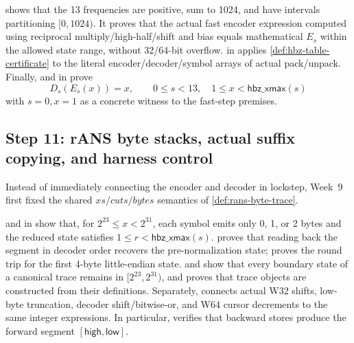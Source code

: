 \begin{verified}
\label{thm:hbz-rans-step}
\leavevmode\par
{} shows that the 13 frequencies are
positive, sum to 1024, and have intervals partitioning \([0,1024)\). It proves
that the actual fast encoder expression computed using reciprocal
multiply/high-half/shift and bias equals mathematical \(E_s\) within the allowed
state range, without 32/64-bit overflow.
 in
 applies
\cref{def:hbz-table-certificate} to the literal encoder/decoder/symbol arrays of
actual pack/unpack. Finally,  and
 in  prove
\[
  D_s(E_s(x))=x,\qquad
  0\le s<13,\quad 1\le x<\mathsf{hbz\_xmax}(s)
\]
with \(s=0,x=1\) as a concrete witness to the fast-step premises.
\end{verified}

\subsection{Step 11: rANS byte stacks, actual suffix copying, and harness control}

Instead of immediately connecting the encoder and decoder in lockstep, Week~9
first fixed the shared \(xs/cuts/bytes\) semantics of \cref{def:rans-byte-trace}.

\begin{verified}
\label{thm:rans-byte-stack}
 and  in
 show that, for \(2^{23}\le x<2^{31}\), each
symbol emits only 0, 1, or 2 bytes and the reduced state satisfies
\(1\le r<\mathsf{hbz\_xmax}(s)\).
 proves that reading back the segment in
decoder order recovers the pre-normalization state;
 proves the round trip for the first
4-byte little-endian state.
 and
 show that every boundary state of a
canonical trace remains in \([2^{23},2^{31})\), and
 proves that trace objects are
constructed from their definitions. Separately,
 connects actual W32 shifts, low-byte
truncation, decoder shift/bitwise-or, and W64 cursor decrements to the same
integer expressions. In particular,
 verifies that backward stores
produce the forward segment \([\mathsf{high},\mathsf{low}]\).
\end{verified}

